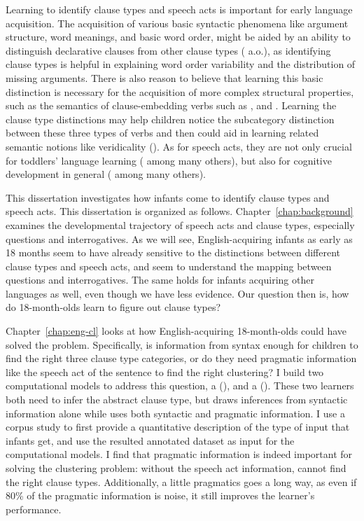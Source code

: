 Learning to identify clause types and speech acts is important for early language acquisition. The acquisition of various basic syntactic phenomena like argument structure, word meanings, and basic word order, might be aided by an ability to distinguish declarative clauses from other clause types (\citealt{pinker1984, pinker1989, gleitman1990, frankgoldwaterfrank2013, perkins2019} a.o.), as identifying clause types is helpful in explaining word order variability and the distribution of missing arguments. There is also reason to believe that learning this basic distinction is necessary for the acquisition of more complex structural properties, such as the semantics of clause-embedding verbs such as ,  and . Learning the clause type distinctions may help children notice the subcategory distinction between these three types of verbs and then could aid in learning related semantic notions like veridicality (\citealt{white2015diss, lewis2017think,dudley2017,hacquardlidz2018}). As for speech acts, they are not only crucial for toddlers' language learning (\citealt{ninio1980, hoff1985cds,yoder1994,rowland2003cdswh, valian2003cds, rowe2017wh, gaudreau2021question} among many others), but also for cognitive development in general (\citealt{hohmann1995educating} among many others). 

This dissertation investigates how infants come to identify clause types and speech acts. This dissertation is organized as follows. Chapter~\ref{chap:background} examines the developmental trajectory of speech acts and clause types, especially questions and interrogatives. As we will see, English-acquiring infants as early as 18 months seem to have already sensitive to the distinctions between different clause types and speech acts, and seem to understand the mapping between questions and interrogatives. The same holds for infants acquiring other languages as well, even though we have less evidence. Our question then is, how do 18-month-olds learn to figure out clause types?

Chapter~\ref{chap:eng-cl} looks at how English-acquiring 18-month-olds could have solved the problem. Specifically, is information from syntax enough for children to find the right three clause type categories, or do they need pragmatic information like the speech act of the sentence to find the right clustering? I build two computational models to address this question, a \distlearner{} (\dlearnerabbr{}), and a \praglearner{} (\plearnerabbr{}). These two learners both need to infer the abstract clause type, but \dlearnerabbr{} draws inferences from syntactic information alone while \plearnerabbr{} uses both syntactic and pragmatic information. I use a corpus study to first provide a quantitative description of the type of input that infants get, and use the resulted annotated dataset as input for the computational models. I find that pragmatic information is indeed important for solving the clustering problem: without the speech act information, \dlearnerabbr{} cannot find the right clause types. Additionally, a little pragmatics goes a long way, as  even if 80\% of the pragmatic information is noise, it still improves the learner's performance. 

